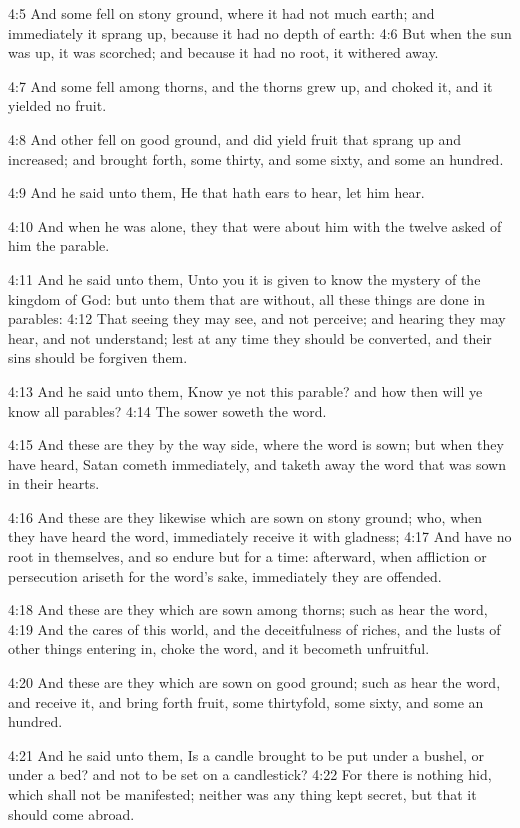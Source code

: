 4:5 And some fell on stony ground, where it had not much earth; and
immediately it sprang up, because it had no depth of earth: 4:6 But
when the sun was up, it was scorched; and because it had no root, it
withered away.

4:7 And some fell among thorns, and the thorns grew up, and choked it,
and it yielded no fruit.

4:8 And other fell on good ground, and did yield fruit that sprang up
and increased; and brought forth, some thirty, and some sixty, and
some an hundred.

4:9 And he said unto them, He that hath ears to hear, let him hear.

4:10 And when he was alone, they that were about him with the twelve
asked of him the parable.

4:11 And he said unto them, Unto you it is given to know the mystery
of the kingdom of God: but unto them that are without, all these
things are done in parables: 4:12 That seeing they may see, and not
perceive; and hearing they may hear, and not understand; lest at any
time they should be converted, and their sins should be forgiven them.

4:13 And he said unto them, Know ye not this parable? and how then
will ye know all parables?  4:14 The sower soweth the word.

4:15 And these are they by the way side, where the word is sown; but
when they have heard, Satan cometh immediately, and taketh away the
word that was sown in their hearts.

4:16 And these are they likewise which are sown on stony ground; who,
when they have heard the word, immediately receive it with gladness;
4:17 And have no root in themselves, and so endure but for a time:
afterward, when affliction or persecution ariseth for the word's sake,
immediately they are offended.

4:18 And these are they which are sown among thorns; such as hear the
word, 4:19 And the cares of this world, and the deceitfulness of
riches, and the lusts of other things entering in, choke the word, and
it becometh unfruitful.

4:20 And these are they which are sown on good ground; such as hear
the word, and receive it, and bring forth fruit, some thirtyfold, some
sixty, and some an hundred.

4:21 And he said unto them, Is a candle brought to be put under a
bushel, or under a bed? and not to be set on a candlestick?  4:22 For
there is nothing hid, which shall not be manifested; neither was any
thing kept secret, but that it should come abroad.

